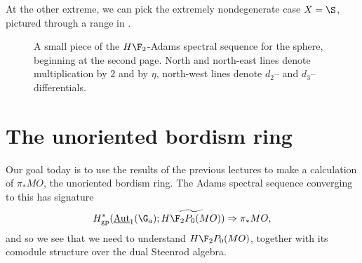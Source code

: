 \begin{example}
\end{example}

\begin{example}
At the other extreme, we can pick the extremely nondegenerate case $X = \S$, pictured through a range in .
\begin{landscape}
\begin{figure}[b]


\caption{A small piece of the $H\F_2$-Adams spectral sequence for the sphere, beginning at the second page.  North and north-east lines denote multiplication by $2$ and by $\eta$, north-west lines denote $d_2$-- and $d_3$--differentials.}\label{HF2ASSFigure}
\end{figure}
\end{landscape}
\end{example}










\section{The unoriented bordism ring}

Our goal today is to use the results of the previous lectures to make a calculation of $\pi_* MO$, the unoriented bordism ring.  The Adams spectral sequence converging to this has signature \[H^*_{\mathrm{gp}}(\InternalAut_1(\G_a); \widetilde{H\F_2P_0(MO)}) \Rightarrow \pi_* MO,\]  and so we see that we need to understand $H\F_2P_0(MO)$, together with its comodule structure over the dual Steenrod algebra.


